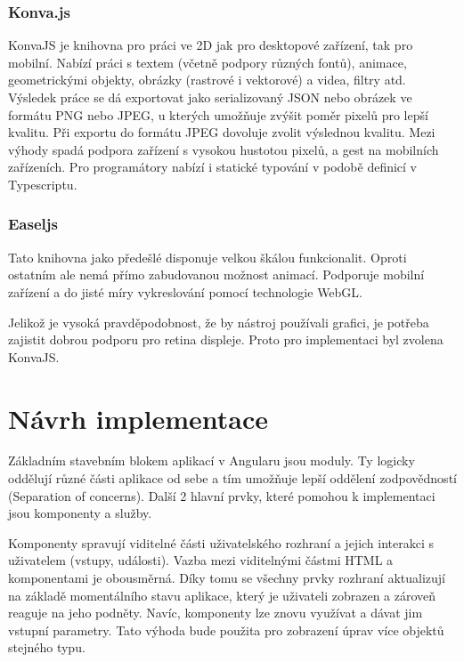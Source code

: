             \subsubsection{Konva.js}
            KonvaJS je knihovna pro práci ve 2D jak pro desktopové zařízení, tak pro mobilní. Nabízí práci s textem (včetně podpory různých fontů),
            animace, geometrickými objekty, obrázky (rastrové i vektorové) a videa, filtry atd. Výsledek práce se dá exportovat jako serializovaný
            JSON nebo obrázek ve formátu PNG nebo JPEG, u kterých umožňuje zvýšit poměr pixelů pro lepší kvalitu.
            Při exportu do formátu JPEG dovoluje zvolit výslednou kvalitu. Mezi výhody spadá podpora zařízení s vysokou hustotou pixelů, a gest na mobilních zařízeních.
            Pro programátory nabízí i statické typování v podobě definicí v Typescriptu. 

            \subsubsection{Easeljs}
            Tato knihovna jako předešlé disponuje velkou škálou funkcionalit.
            Oproti ostatním ale nemá přímo zabudovanou možnost animací.
            Podporuje mobilní zařízení a do jisté míry vykreslování pomocí technologie WebGL.

            Jelikož je vysoká pravděpodobnost, že by nástroj používali grafici, je potřeba zajistit dobrou podporu pro retina displeje.
            Proto pro implementaci byl zvolena KonvaJS.

    \section{Návrh implementace}
    Základním stavebním blokem aplikací v Angularu jsou moduly. Ty logicky oddělují různé části aplikace od sebe a tím umožňuje lepší oddělení
     zodpovědností (Separation of concerns). Další 2 hlavní prvky, které pomohou k implementaci jsou komponenty a služby.  

    Komponenty spravují viditelné části uživatelského rozhraní a jejich interakci s uživatelem (vstupy, události).
    Vazba mezi viditelnými částmi HTML a komponentami je obousměrná. Díky tomu se všechny prvky rozhraní aktualizují na základě momentálního stavu aplikace,
    který je uživateli zobrazen a zároveň reaguje na jeho podněty. Navíc, komponenty lze znovu využívat a dávat jim vstupní parametry.
    Tato výhoda bude použita pro zobrazení úprav více objektů stejného typu. 

